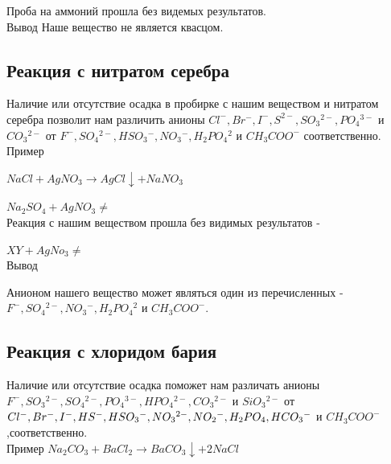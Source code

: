 \documentclass[a4paper,14pt,titlepage,twoside]{article}
\begin{document}
            Проба на аммоний прошла без видемых результатов.\\

            Вывод\newline
            Наше вещество не является квасцом.



        \subsection{Реакция с нитратом серебра}
            Наличие или отсутствие осадка в пробирке с нашим веществом и нитратом серебра
            позволит нам различить анионы $Cl^-, Br^-, I^-,  S^{2-}, SO_3{}^{2-}, PO_4{}^{3-} $ и $ CO_3{}^{2-}$ 
            от $F^-, SO_4{}^{2-}, HSO_3{}^-, NO_3{}^-, H_2PO_4{}^2$ и $CH_3COO^-$ соответственно.\\
            
            Пример

            $NaCl + AgNO_3 \to AgCl\downarrow + NaNO_3$
            \par$Na_2SO_4 + AgNO_3 \ne$\\

            Реакция с нашим веществом прошла без видимых результатов -
            \par$XY + AgNo_3 \ne$\\


            Вывод

            Анионом нашего вещество может являться один из перечисленных -
            $F^-, SO_4{}^{2-}, NO_3{}^-, H_2PO_4{}^2$ и $CH_3COO^-$.

         \newpage
         \subsection{Реакция с хлоридом бария}
            Наличие или отсутствие осадка поможет нам различать анионы\newline
            $F^-, SO_3{}^{2-}, SO_4{}^{2-}, PO_4{}^{3-}, HPO_4{}^{2-}, CO_3{}^{2-}$ и 
            $SiO_3{}^{2-}$ от $Cl^-, Br^-, I^-, HS^-, \newline 
            HSO_3{}^-, NO_3{}^{2-}, NO_2{}^-, H_2PO_4, 
            HCO_3{}^-$ и $ CH_3COO^-$
            ,соответственно.\\

            Пример
            $Na_2CO_3 + BaCl_2 \to BaCO_3\downarrow + 2NaCl$\\
\end{document}
